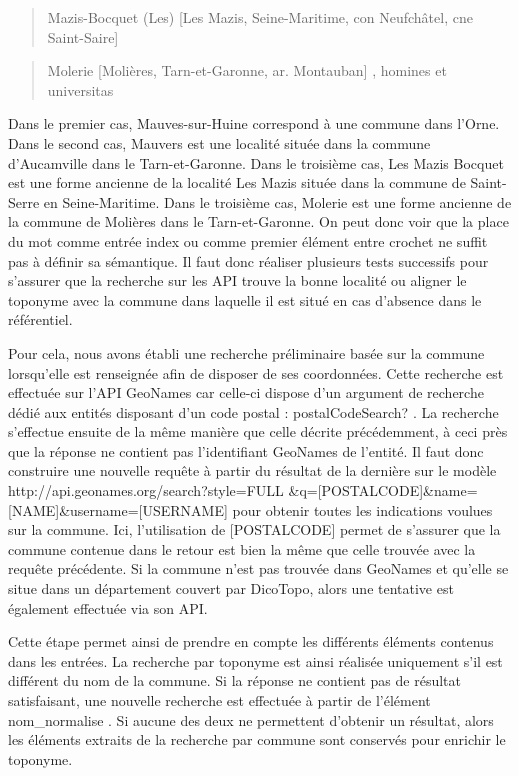 \documentclass[a4paper,12pt,twoside]{book}
\begin{document}
	\begin{quotation}
		Mazis-Bocquet (Les) [Les Mazis, Seine-Maritime, con Neufchâtel, cne Saint-Saire]
	\end{quotation}

	\begin{quotation}
		Molerie [Molières, Tarn-et-Garonne, ar. Montauban] , homines et universitas
	\end{quotation}
	
	
	\noindent Dans le premier cas, Mauves-sur-Huine correspond à une commune dans l'Orne. Dans le second cas, Mauvers est une localité située dans la commune d'Aucamville dans le Tarn-et-Garonne. Dans le troisième cas, Les Mazis Bocquet est une forme ancienne de la localité Les Mazis située dans la commune de Saint-Serre en Seine-Maritime. Dans le troisième cas, Molerie est une forme ancienne de la commune de Molières dans le Tarn-et-Garonne. On peut donc voir que la place du mot comme entrée index ou comme premier élément entre crochet ne suffit pas à définir sa sémantique. Il faut donc réaliser plusieurs tests successifs pour s'assurer que la recherche sur les API trouve la bonne localité ou aligner le toponyme avec la commune dans laquelle il est situé en cas d'absence dans le référentiel.
	
	Pour cela, nous avons établi une recherche préliminaire basée sur la commune lorsqu'elle est renseignée afin de disposer de ses coordonnées. Cette recherche est effectuée sur l'API GeoNames car celle-ci dispose d'un argument de recherche dédié aux entités disposant d'un code postal : \og postalCodeSearch? \fg{}. La recherche s'effectue ensuite de la même manière que celle décrite précédemment, à ceci près que la réponse ne contient pas l'identifiant GeoNames de l'entité. Il faut donc construire une nouvelle requête à partir du résultat de la dernière sur le modèle \og http://api.geonames.org/search?style=FULL \&q=[POSTALCODE]\&name=[NAME]\&username=[USERNAME]\fg{} pour obtenir toutes les indications voulues sur la commune. Ici, l'utilisation de [POSTALCODE] permet de s'assurer que la commune contenue dans le retour est bien la même que celle trouvée avec la requête précédente. Si la commune n'est pas trouvée dans GeoNames et qu'elle se situe dans un département couvert par DicoTopo, alors une tentative est également effectuée via son API.
	
	Cette étape permet ainsi de prendre en compte les différents éléments contenus dans les entrées. La recherche par toponyme est ainsi réalisée uniquement s'il est différent du nom de la commune. Si la réponse ne contient pas de résultat satisfaisant, une nouvelle recherche est effectuée à partir de l'élément \og nom\_normalise \fg{}. Si aucune des deux ne permettent d'obtenir un résultat, alors les éléments extraits de la recherche par commune sont conservés pour enrichir le toponyme.
	
\end{document}
